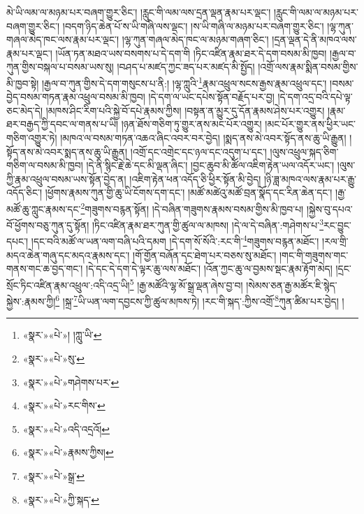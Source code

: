 མེ་ཡི་ལམ་ལ་མཉམ་པར་བཞག་གྱུར་ཅིང་། །རླུང་གི་ལམ་ལས་དྲན་ལྡན་རྣམ་པར་ལྡང་། །རླུང་གི་ལམ་ལ་མཉམ་པར་བཞག་གྱུར་ཅིང་། །བདག་ཉིད་ཆེན་པོ་ས་ཡི་གཞི་ལས་ལྡང་། །ས་ཡི་གཞི་ལ་མཉམ་པར་བཞག་གྱུར་ཅིང་། །ལྷ་ཀུན་གཞལ་མེད་ཁང་ལས་རྣམ་པར་ལྡང་། །ལྷ་ཀུན་གཞལ་མེད་ཁང་ལ་མཉམ་གཞག་ཅིང་། །དྲན་ལྡན་དེ་ནི་མཁའ་ལས་རྣམ་པར་ལྡང་། །ཡོན་ཏན་མཐའ་ཡས་བསགས་པ་དེ་དག་གི །ཏིང་འཛིན་རྣམ་ཐར་དེ་དག་བསམ་མི་ཁྱབ། །རྒྱལ་བ་ཀུན་གྱིས་བསྐལ་པ་བསམ་ཡས་སུ། །བཤད་པ་མཛད་ཀྱང་ཟད་པར་མཛད་མི་སྤྱོད། །འགྲོ་ལས་རྣམ་སྨིན་བསམ་གྱིས་མི་ཁྱབ་སྟེ། །རྒྱལ་བ་ཀུན་གྱིས་དེ་དག་གསུངས་པ་ནི:། །ལྷ་ཀླུའི་\footnote{«སྣར་»«པེ་»། །ཀླུ་ཡི་}རྣམ་འཕྲུལ་སངས་རྒྱས་རྣམ་འཕྲུལ་དང་། །བསམ་བྱེད་བསམ་གཏན་རྣམ་འཕྲུལ་བསམ་མི་ཁྱབ། །དེ་དག་ལ་ཡང་དཔེས་སྟོན་བརྗོད་པར་བྱ། །དེ་དག་འདྲ་བའི་དཔེ་ལྟ་ཅང་མེད་དེ། །མཁས་ཤིང་རིག་པའི་སྐྱེ་བོ་དཔེ་རྣམས་ཀྱིས། །བསྟན་ན་མྱུར་དུ་དོན་རྣམས་ཤེས་པར་འགྱུར། །རྣམ་ཐར་བརྒྱད་ཀྱི་དབང་ལ་གནས་པ་ཡི། །ཉན་ཐོས་གཅིག་ཏུ་གྱུར་ནས་མང་པོར་འགྱུར། །མང་པོར་གྱུར་ནས་ཕྱིར་ཡང་གཅིག་འགྱུར་ཏེ། །མཁའ་ལ་བསམ་གཏན་འཆའ་ཞིང་འབར་བར་བྱེད། །སྨད་ནས་མེ་འབར་སྟོད་ནས་ཆུ་ཡི་རྒྱུན། །སྟོད་ནས་མེ་འབར་སྨད་ནས་ཆུ་ཡི་རྒྱུན། །འགྲོ་དང་འགྲེང་དང་ཉལ་དང་འདུག་པ་དང་། །ལུས་འཕྲུལ་སྐད་ཅིག་གཅིག་ལ་བསམ་མི་ཁྱབ། །དེ་ནི་སྙིང་རྗེ་ཆེ་དང་མི་ལྡན་ཞིང་། །བྱང་ཆུབ་མི་ཚོལ་འཇིག་རྟེན་ཡལ་འདོར་ཡང་། །ལུས་ཀྱི་རྣམ་འཕྲུལ་བསམ་ཡས་སྟོན་བྱེད་ན། །འཇིག་རྟེན་ཕན་འདོད་ཅི་ཕྱིར་སྟོན་མི་བྱེད། །ཉི་ཟླ་མཁའ་ལས་རྣམ་པར་རྒྱུ་འདོད་ཅིང་། །ཕྱོགས་རྣམས་ཀུན་གྱི་ཆུ་ཡི་ངོགས་དག་དང་། །མཚོ་མཚེའུ་མཚོ་བྲན་སྣོད་དང་རིན་ཆེན་དང་། །རྒྱ་མཚོ་ཆུ་ཀླུང་རྣམས་དང་\footnote{«སྣར་»«པེ་»སུ་}གཟུགས་བརྙན་སྟོན། །དེ་བཞིན་གཟུགས་རྣམས་བསམ་གྱིས་མི་ཁྱབ་པ། །སྐྱེས་བུ་དཔའ་བོ་ཕྱོགས་བཅུ་ཀུན་དུ་སྟོན། །ཏིང་འཛིན་རྣམ་ཐར་ཀུན་གྱི་ཚུལ་ལ་མཁས། །དེ་ལ་དེ་བཞིན་:གཤེགས་པ་\footnote{«སྣར་»«པེ་»གཤེགས་པར་}རང་བྱུང་དཔང་། །དང་བའི་མཚོ་ལ་ཡན་ལག་བཞི་པའི་དམག །དེ་དག་སོ་སོའི་:རང་གི་\footnote{«སྣར་»«པེ་»རང་གིས་}གཟུགས་བརྙན་མཐོང་། །རལ་གྲི་མདའ་ཆེན་གཞུ་དང་མདའ་རྣམས་དང་། །གོ་གྱོན་བཞོན་དང་ཐེག་པར་བཅས་སུ་མཐོང་། །གང་གི་གཟུགས་གང་གནས་གང་ཆ་བྱད་གང་། །དེ་དང་དེ་དག་དེ་ལྟར་ཆུ་ལས་མཐོང་། །འོན་ཀྱང་ཆུ་ལ་བྱམས་སྡང་རྣམ་རྟོག་མེད། །དྲང་སྲོང་ཏིང་འཛིན་རྣམ་འཕྲུལ་:འདི་འདྲ་ཡི།\footnote{«སྣར་»«པེ་»འདི་འདྲའོ།} །རྒྱ་མཚོའི་ལྷ་མོ་སྒྲ་ལྡན་ཞེས་བྱ་བ། །སེམས་ཅན་རྒྱ་མཚོར་ཇི་སྙེད་སྐྱེས་:རྣམས་ཀྱི།\footnote{«སྣར་»«པེ་»རྣམས་ཀྱིས།} །སྐྲ་\footnote{«སྣར་»«པེ་»སྒྲ་}ཡི་ཡན་ལག་དབྱངས་ཀྱི་ཚུལ་མཁས་ཏེ། །རང་གི་སྐད་:ཀྱིས་འགྲོ་\footnote{«སྣར་»«པེ་»ཀྱི་སྐད་}ཀུན་ཚིམ་པར་བྱེད། །
